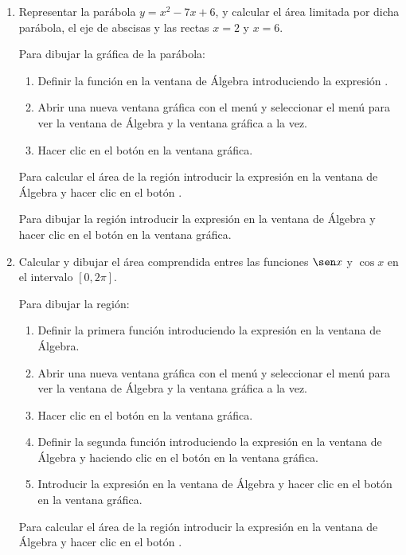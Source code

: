 \begin{enumerate}[leftmargin=*]
\item Representar la parábola $y=x^{2}-7x+6$, y calcular el área limitada por dicha parábola, el eje de abscisas y las rectas $x=2$ y $x=6$.
\begin{indicacion}
Para dibujar la gráfica de la parábola:
\begin{enumerate}
\item Definir la función en la ventana de Álgebra introduciendo la expresión .
\item Abrir una nueva ventana gráfica con el menú  y seleccionar el menú  para ver la ventana de Álgebra y la ventana gráfica a la vez.
\item Hacer clic en el botón  en la ventana gráfica.
\end{enumerate}
Para calcular el área de la región introducir la expresión  en la ventana de Álgebra y hacer clic en el botón .

Para dibujar la región introducir la expresión  en la ventana de Álgebra y hacer clic en el botón  en la ventana gráfica.
\end{indicacion}

\item Calcular y dibujar el área comprendida entres las funciones $\sen x$ y $\cos x$ en el intervalo $[0,2\pi]$.
\begin{indicacion}
Para dibujar la región:
\begin{enumerate}
\item Definir la primera función introduciendo la expresión  en la ventana de Álgebra.
\item Abrir una nueva ventana gráfica con el menú  y seleccionar el menú  para ver la ventana de Álgebra y la ventana gráfica a la vez.
\item Hacer clic en el botón  en la ventana gráfica.
\item Definir la segunda función introduciendo la expresión  en la ventana de Álgebra y haciendo clic en el botón  en la ventana gráfica.
\item Introducir la expresión  en la ventana de Álgebra y hacer clic en el botón  en la ventana gráfica.
\end{enumerate}
Para calcular el área de la región introducir la expresión  en la ventana de Álgebra y hacer clic en el botón .
\end{indicacion}



\end{enumerate}
